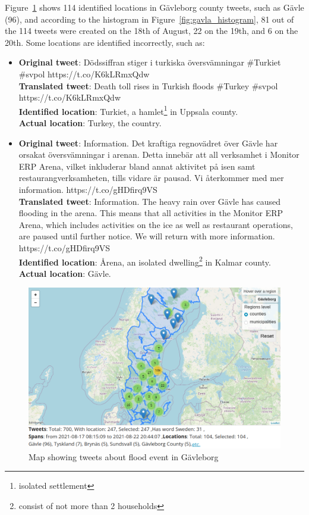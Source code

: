 Figure~\ref{fig:gavle_map} shows 114 identified locations in Gävleborg county tweets, such as Gävle (96), and
according to the histogram in Figure~\ref{fig:gavla_histogram}, 81 out of the 114 tweets were created on the 18th of August,
22 on the 19th, and 6 on the 20th. Some locations are identified incorrectly, such as:
\begin{itemize}
  \item \textbf{Original tweet}: Dödssiffran stiger i turkiska översvämningar \#Turkiet \#svpol
    https://t.co/K6kLRmxQdw \\
  \textbf{Translated tweet}: Death toll rises in Turkish floods \#Turkey \#svpol \\
    https://t.co/K6kLRmxQdw \\
    \textbf{Identified location}: Turkiet, a hamlet\footnote{isolated settlement} in Uppsala county. \\
    \textbf{Actual location}: Turkey, the country.

  \item \textbf{Original tweet}: Information. Det kraftiga regnovädret över Gävle har orsakat
    översvämningar i arenan. Detta innebär att all verksamhet i Monitor ERP Arena, vilket inkluderar
    bland annat aktivitet på isen samt restaurangverksamheten, tills vidare är pausad. Vi återkommer
    med mer information. https://t.co/gHDfirq9VS \\
    \textbf{Translated tweet}: Information. The heavy rain over Gävle has caused flooding in the arena.
    This means that all activities in the Monitor ERP Arena, which includes activities on the ice as
    well as restaurant operations, are paused until further notice. We will return with more
    information. https://t.co/gHDfirq9VS \\
    \textbf{Identified location}: Årena, an isolated dwelling\footnote{consist of not more than 2 households}
    in Kalmar county. \\
    \textbf{Actual location}: Gävle.
\end{itemize}

\begin{figure}[H]
  \begin{center}
    \includegraphics[width=\columnwidth]{./images/gavle_map.png}
  \end{center}
  \caption{Map showing tweets about flood event in Gävleborg}
  \label{fig:gavle_map}
\end{figure}

